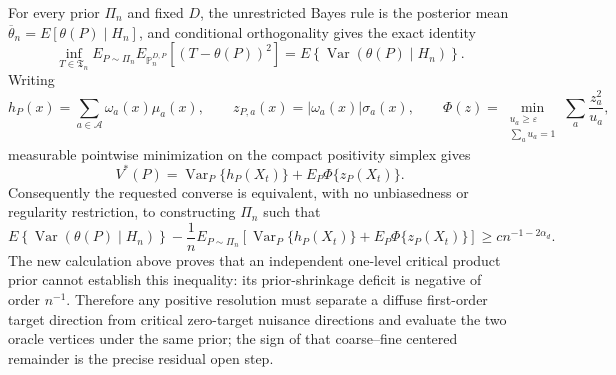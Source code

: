 For every prior \(\Pi_n\) and fixed \(D\), the unrestricted Bayes rule is the posterior mean \(\overline\theta_n=E[\theta(P)\mid H_n]\), and conditional orthogonality gives the exact identity
\[
\inf_{T\in\mathfrak T_n}
E_{P\sim\Pi_n}E_{\mathbb P_n^{D,P}}[(T-\theta(P))^2]
=E\!\left\{\operatorname{Var}(\theta(P)\mid H_n)\right\}.
\]
Writing
\[
h_P(x)=\sum_{a\in\mathcal A}\omega_a(x)\mu_a(x),
\qquad
z_{P,a}(x)=|\omega_a(x)|\sigma_a(x),
\qquad
\Phi(z)=\min_{\substack{u_a\geq\varepsilon\\\sum_a u_a=1}}
\sum_a\frac{z_a^2}{u_a},
\]
measurable pointwise minimization on the compact positivity simplex gives
\[
V^*(P)=\operatorname{Var}_P\{h_P(X_t)\}+E_P\Phi\{z_P(X_t)\}.
\]
Consequently the requested converse is equivalent, with no unbiasedness or regularity restriction, to constructing \(\Pi_n\) such that
\[
E\!\left\{\operatorname{Var}(\theta(P)\mid H_n)\right\}
-\frac1nE_{P\sim\Pi_n}\!\left[
\operatorname{Var}_P\{h_P(X_t)\}+E_P\Phi\{z_P(X_t)\}
\right]
\geq c n^{-1-2\alpha_d}.
\]
The new calculation above proves that an independent one-level critical product prior cannot establish this inequality: its prior-shrinkage deficit is negative of order \(n^{-1}\).  Therefore any positive resolution must separate a diffuse first-order target direction from critical zero-target nuisance directions and evaluate the two oracle vertices under the same prior; the sign of that coarse--fine centered remainder is the precise residual open step.